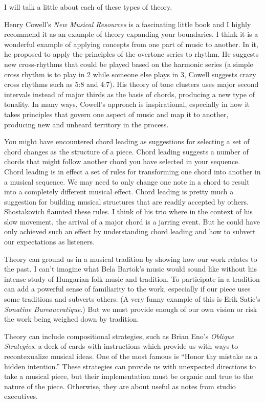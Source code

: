 \documentclass[
]{book}
\begin{document}
I will talk a little about each of these types of theory.

Henry Cowell's \emph{New Musical Resources} is a fascinating little book and I highly recommend it as an example of theory expanding your boundaries. I think it is a wonderful example of applying concepts from one part of music to another. In it, he proposed to apply the principles of the overtone series to rhythm. He suggests new cross-rhythms that could be played based on the harmonic series (a simple cross rhythm is to play in 2 while someone else plays in 3, Cowell suggests crazy cross rhythms such as 5:8 and 4:7). His theory of tone clusters uses major second intervals instead of major thirds as the basis of chords, producing a new type of tonality. In many ways, Cowell's approach is inspirational, especially in how it takes principles that govern one aspect of music and map it to another, producing new and unheard territory in the process.

You might have encountered chord leading as suggestions for selecting a set of chord changes as the structure of a piece. Chord leading suggests a number of chords that might follow another chord you have selected in your sequence. Chord leading is in effect a set of rules for transforming one chord into another in a musical sequence. We may need to only change one note in a chord to result into a completely different musical effect. Chord leading is pretty much a suggestion for building musical structures that are readily accepted by others. Shostakovich flaunted these rules. I think of his trio where in the context of his slow movement, the arrival of a major chord is a jarring event. But he could have only achieved such an effect by understanding chord leading and how to subvert our expectations as listeners.

Theory can ground us in a musical tradition by showing how our work relates to the past. I can't imagine what Bela Bartok's music would sound like without his intense study of Hungarian folk music and tradition. To participate in a tradition can add a powerful sense of familiarity to the work, especially if our piece uses some traditions and subverts others. (A very funny example of this is Erik Satie's \emph{Sonatine Bureaucratique}.) But we must provide enough of our own vision or risk the work being weighed down by tradition.

Theory can include compositional strategies, such as Brian Eno's \emph{Oblique Strategies}, a deck of cards with instructions which provide us with ways to recontexualize musical ideas. One of the most famous is ``Honor thy mistake as a hidden intention.'' These strategies can provide us with unexpected directions to take a musical piece, but their implementation must be organic and true to the nature of the piece. Otherwise, they are about useful as notes from studio executives.
\end{document}
